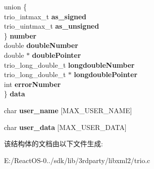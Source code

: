 \begin{DoxyCompactItemize}
\begin{tabbing}
\>union \{\\
\>\>trio\_intmax\_t {\bfseries as\_signed}\\
\>\>trio\_uintmax\_t {\bfseries as\_unsigned}\\
\>\} {\bfseries number}\\
\>double {\bfseries doubleNumber}\\
\>double $\ast$ {\bfseries doublePointer}\\
\>trio\_long\_double\_t {\bfseries longdoubleNumber}\\
\>trio\_long\_double\_t $\ast$ {\bfseries longdoublePointer}\\
\>int {\bfseries errorNumber}\\
\} {\bfseries data}\\

\end{tabbing}\item 
\mbox{\label{structtrio__parameter__t_af6034b47fe7dc5d0ca6f5829d9363711}} 
char {\bfseries user\+\_\+name} \mbox{[}M\+A\+X\+\_\+\+U\+S\+E\+R\+\_\+\+N\+A\+ME\mbox{]}
\item 
\mbox{\label{structtrio__parameter__t_a84a5ee4aeddd9ba76c2f7a5271139d06}} 
char {\bfseries user\+\_\+data} \mbox{[}M\+A\+X\+\_\+\+U\+S\+E\+R\+\_\+\+D\+A\+TA\mbox{]}
\end{DoxyCompactItemize}


该结构体的文档由以下文件生成\+:\begin{DoxyCompactItemize}
\item 
E\+:/\+React\+O\+S-\/0../sdk/lib/3rdparty/libxml2/trio.\+c\end{DoxyCompactItemize}
